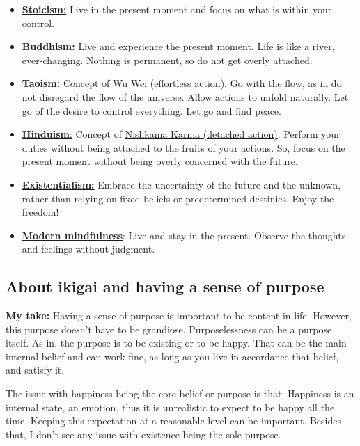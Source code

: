 \documentclass[
]{book}
\providecommand{\tightlist}{%
  \setlength{\itemsep}{0pt}\setlength{\parskip}{0pt}}
\begin{document}
\begin{itemize}
\tightlist
\item
  \href{https://en.wikipedia.org/wiki/Stoicism}{\textbf{Stoicism:}} Live in the present moment and focus on what is within your control.
\item
  \href{https://en.wikipedia.org/wiki/Buddhist_philosophy}{\textbf{Buddhism:}} Live and experience the present moment. Life is like a river, ever-changing. Nothing is permanent, so do not get overly attached.
\item
  \href{https://en.wikipedia.org/wiki/Taoism}{\textbf{Taoism:}} Concept of \href{https://en.wikipedia.org/wiki/Wu_wei}{Wu Wei (effortless action)}. Go with the flow, as in do not disregard the flow of the universe. Allow actions to unfold naturally. Let go of the desire to control everything. Let go and find peace.
\item
  \href{https://en.wikipedia.org/wiki/Hindu_philosophy}{\textbf{Hinduism}:} Concept of \href{https://en.wikipedia.org/wiki/Nishkama_Karma}{Nishkama Karma (detached action)}. Perform your duties without being attached to the fruits of your actions. So, focus on the present moment without being overly concerned with the future.
\item
  \href{https://en.wikipedia.org/wiki/Existentialism}{\textbf{Existentialism:}} Embrace the uncertainty of the future and the unknown, rather than relying on fixed beliefs or predetermined destinies. Enjoy the freedom!
\item
  \href{https://en.wikipedia.org/wiki/Mindfulness}{\textbf{Modern mindfulness}}: Live and stay in the present. Observe the thoughts and feelings without judgment.
\end{itemize}

\hypertarget{about-ikigai-and-having-a-sense-of-purpose}{%
\subsection{About ikigai and having a sense of purpose}\label{about-ikigai-and-having-a-sense-of-purpose}}

\textbf{My take:} Having a sense of purpose is important to be content in life. However, this purpose doesn't have to be grandiose. Purposelessness can be a purpose itself. As in, the purpose is to be existing or to be happy. That can be the main internal belief and can work fine, as long as you live in accordance that belief, and satisfy it.

The issue with happiness being the core belief or purpose is that: Happiness is an internal state, an emotion, thus it is unrealistic to expect to be happy all the time. Keeping this expectation at a reasonable level can be important. Besides that, I don't see any issue with existence being the sole purpose.
\end{document}
